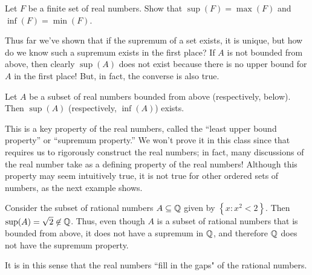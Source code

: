 \documentclass[../notes.tex]{subfiles}
\begin{document}
\begin{exercise}
\label{ex:sup-extend-max}
    Let $F$ be a finite set of real numbers. Show that $\sup(F)=\max(F)$ and $\inf(F) = \min(F)$.
\end{exercise}
Thus far we've shown that if the supremum of a set exists, it is unique, but how do we know such a supremum exists in the first place? If $A$ is not bounded from above, then clearly $\sup(A)$ does not exist because there is no upper bound for $A$ in the first place! But, in fact, the converse is also true.
\begin{proposition}
\label{prop:sup-prop}
    Let $A$ be a subset of real numbers bounded from above (respectively, below). Then $\sup(A)$ (respectively, $\inf(A)$) exists.
\end{proposition}
This is a key property of the real numbers, called the ``least upper bound property'' or ``supremum property.'' We won't prove it in this class since that requires us to rigorously construct the real numbers; in fact, many discussions of the real number take  as a defining property of the real numbers! Although this property may seem intuitively true, it is not true for other ordered sets of numbers, as the next example shows.
\begin{example}
    Consider the subset of rational numbers $A\subseteq \mathbb Q$ given by $\left\{x : x^2 < 2\right\}$. Then $\sup(A)=\sqrt{2}\not\in \mathbb Q$. Thus, even though $A$ is a subset of rational numbers that is bounded from above, it does not have a supremum in $\mathbb Q$, and therefore $\mathbb Q$ does not have the supremum property.
\end{example}
It is in this sense that the real numbers ``fill in the gaps"
of the rational numbers.
\end{document}
